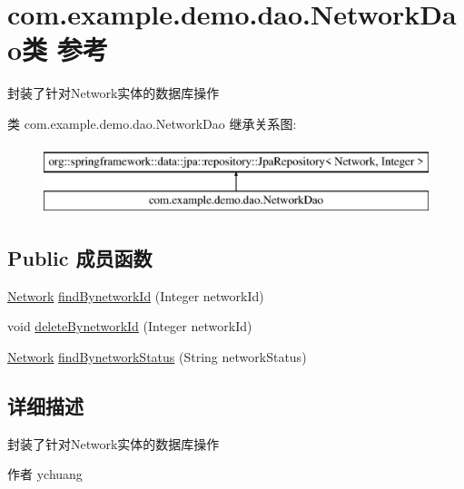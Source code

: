 \hypertarget{interfacecom_1_1example_1_1demo_1_1dao_1_1_network_dao}{}\section{com.\+example.\+demo.\+dao.\+Network\+Dao类 参考}
\label{interfacecom_1_1example_1_1demo_1_1dao_1_1_network_dao}


封装了针对\+Network实体的数据库操作  


类 com.\+example.\+demo.\+dao.\+Network\+Dao 继承关系图\+:\begin{figure}[H]
\begin{center}
\leavevmode
\includegraphics[height=2.000000cm]{interfacecom_1_1example_1_1demo_1_1dao_1_1_network_dao}
\end{center}
\end{figure}
\subsection*{Public 成员函数}
\begin{DoxyCompactItemize}
\item 
\mbox{\hyperlink{classcom_1_1example_1_1demo_1_1modular_1_1_network}{Network}} \mbox{\hyperlink{interfacecom_1_1example_1_1demo_1_1dao_1_1_network_dao_a9001b3f111bb64f56e7c49cad4a119d5}{find\+Bynetwork\+Id}} (Integer network\+Id)
\item 
void \mbox{\hyperlink{interfacecom_1_1example_1_1demo_1_1dao_1_1_network_dao_a97455a3cd24c3e02999afdf07a5db225}{delete\+Bynetwork\+Id}} (Integer network\+Id)
\item 
\mbox{\hyperlink{classcom_1_1example_1_1demo_1_1modular_1_1_network}{Network}} \mbox{\hyperlink{interfacecom_1_1example_1_1demo_1_1dao_1_1_network_dao_ad4c0cc2d9c234006900bd0bd0718069a}{find\+Bynetwork\+Status}} (String network\+Status)
\end{DoxyCompactItemize}


\subsection{详细描述}
封装了针对\+Network实体的数据库操作 

\begin{DoxyAuthor}{作者}
ychuang 
\end{DoxyAuthor}


